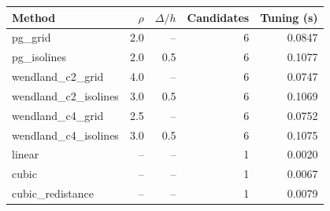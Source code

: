 \begin{tabular}{lrrrr}\toprule
Method & $\rho$ & $\Delta/h$ & Candidates & Tuning (s) \\ \midrule
pg\_grid & 2.0 & -- & 6 & 0.0847 \\
pg\_isolines & 2.0 & 0.5 & 6 & 0.1077 \\
wendland\_c2\_grid & 4.0 & -- & 6 & 0.0747 \\
wendland\_c2\_isolines & 3.0 & 0.5 & 6 & 0.1069 \\
wendland\_c4\_grid & 2.5 & -- & 6 & 0.0752 \\
wendland\_c4\_isolines & 3.0 & 0.5 & 6 & 0.1075 \\
linear & -- & -- & 1 & 0.0020 \\
cubic & -- & -- & 1 & 0.0067 \\
cubic\_redistance & -- & -- & 1 & 0.0079 \\
\bottomrule\end{tabular}
